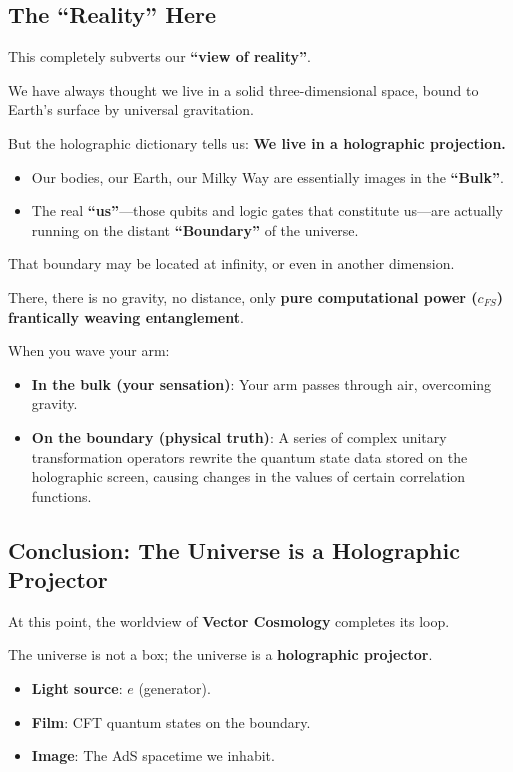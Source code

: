 \subsection{The ``Reality'' Here}

This completely subverts our \textbf{``view of reality''}.

We have always thought we live in a solid three-dimensional space, bound to Earth's surface by universal gravitation.

But the holographic dictionary tells us: \textbf{We live in a holographic projection.}

\begin{itemize}
\item Our bodies, our Earth, our Milky Way are essentially images in the \textbf{``Bulk''}.

\item The real \textbf{``us''}---those qubits and logic gates that constitute us---are actually running on the distant \textbf{``Boundary''} of the universe.
\end{itemize}

That boundary may be located at infinity, or even in another dimension.

There, there is no gravity, no distance, only \textbf{pure computational power ($c_{FS}$) frantically weaving entanglement}.

When you wave your arm:

\begin{itemize}
\item \textbf{In the bulk (your sensation)}: Your arm passes through air, overcoming gravity.

\item \textbf{On the boundary (physical truth)}: A series of complex unitary transformation operators rewrite the quantum state data stored on the holographic screen, causing changes in the values of certain correlation functions.
\end{itemize}

\subsection{Conclusion: The Universe is a Holographic Projector}

At this point, the worldview of \textbf{Vector Cosmology} completes its loop.

The universe is not a box; the universe is a \textbf{holographic projector}.

\begin{itemize}
\item \textbf{Light source}: $e$ (generator).

\item \textbf{Film}: CFT quantum states on the boundary.

\item \textbf{Image}: The AdS spacetime we inhabit.
\end{itemize}


